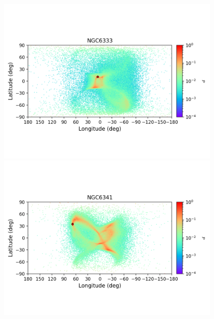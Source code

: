         \begin{figure}
            \begin{center}
                \includegraphics[clip=true, trim = 0mm 20mm 0mm 10mm, width=1\columnwidth]{images/error_plots_NGC6333.png}
                \includegraphics[clip=true, trim = 0mm 20mm 0mm 10mm, width=1\columnwidth]{images/error_plots_NGC6341.png}
                

\end{center}
\end{figure}

